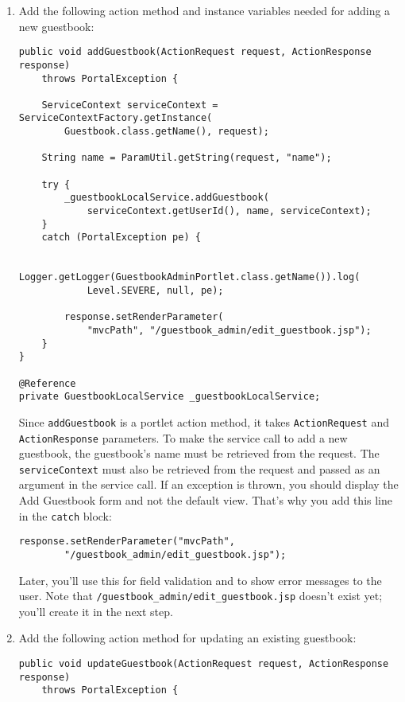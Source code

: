 \begin{enumerate}
\def\labelenumi{\arabic{enumi}.}
\item
  Add the following action method and instance variables needed for
  adding a new guestbook:

\begin{verbatim}
public void addGuestbook(ActionRequest request, ActionResponse response)
    throws PortalException {

    ServiceContext serviceContext = ServiceContextFactory.getInstance(
        Guestbook.class.getName(), request);

    String name = ParamUtil.getString(request, "name");

    try {
        _guestbookLocalService.addGuestbook(
            serviceContext.getUserId(), name, serviceContext);
    }
    catch (PortalException pe) {

        Logger.getLogger(GuestbookAdminPortlet.class.getName()).log(
            Level.SEVERE, null, pe);

        response.setRenderParameter(
            "mvcPath", "/guestbook_admin/edit_guestbook.jsp");
    }
}

@Reference
private GuestbookLocalService _guestbookLocalService;
\end{verbatim}

  Since \texttt{addGuestbook} is a portlet action method, it takes
  \texttt{ActionRequest} and \texttt{ActionResponse} parameters. To make
  the service call to add a new guestbook, the guestbook's name must be
  retrieved from the request. The \texttt{serviceContext} must also be
  retrieved from the request and passed as an argument in the service
  call. If an exception is thrown, you should display the Add Guestbook
  form and not the default view. That's why you add this line in the
  \texttt{catch} block:

\begin{verbatim}
response.setRenderParameter("mvcPath",
        "/guestbook_admin/edit_guestbook.jsp");
\end{verbatim}

  Later, you'll use this for field validation and to show error messages
  to the user. Note that \texttt{/guestbook\_admin/edit\_guestbook.jsp}
  doesn't exist yet; you'll create it in the next step.
\item
  Add the following action method for updating an existing guestbook:

\begin{verbatim}
public void updateGuestbook(ActionRequest request, ActionResponse response)
    throws PortalException {


\end{verbatim}
\end{enumerate}
